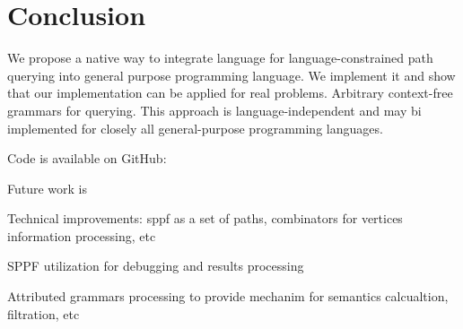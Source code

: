 \section{Conclusion}

We propose a native way to integrate language for language-constrained path querying into general purpose programming language.
We implement it and show that our implementation can be applied for real  problems.
Arbitrary context-free grammars for querying.
This approach is language-independent and may bi implemented for closely all general-purpose programming languages.

Code is available on GitHub: 

Future work is

Technical improvements: sppf as a set of paths, combinators for vertices information processing, etc

SPPF utilization for debugging and results processing

Attributed grammars processing to provide mechanim for semantics calcualtion, filtration, etc   